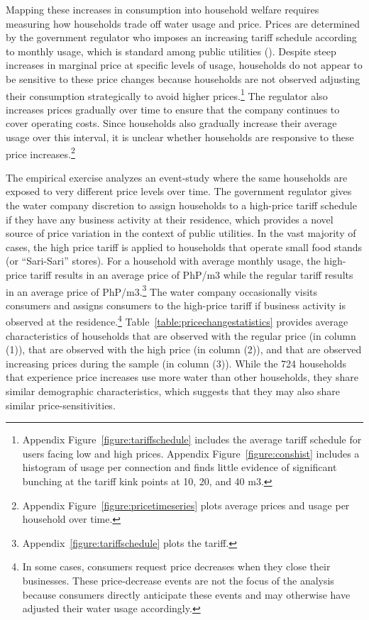 \documentclass[12pt,table]{article}
\begin{document}
Mapping these increases in consumption into household welfare requires measuring how households trade off water usage and price.  Prices are determined by the government regulator who imposes an increasing tariff schedule according to monthly usage, which is standard among public utilities (\cite{hoque2013state}).  Despite steep increases in marginal price at specific levels of usage, households do not appear to be sensitive to these price changes because households are not observed adjusting their consumption strategically to avoid higher prices.\footnote{Appendix Figure~\ref{figure:tariffschedule} includes the average tariff schedule for users facing low and high prices.  Appendix Figure~\ref{figure:conshist} includes a histogram of usage per connection and finds little evidence of significant bunching at the tariff kink points at 10, 20, and 40 m3.}  The regulator also increases prices gradually over time to ensure that the company continues to cover operating costs.  Since households also gradually increase their average usage over this interval, it is unclear whether households are responsive to these price increases.\footnote{Appendix Figure~\ref{figure:pricetimeseries} plots average prices and usage per household over time.}

The empirical exercise analyzes an event-study where the same households are exposed to very different price levels over time.  The government regulator gives the water company discretion to assign households to a high-price tariff schedule if they have any business activity at their residence, which provides a novel source of price variation in the context of public utilities.  In the vast majority of cases, the high price tariff is applied to households that operate small food stands (or ``Sari-Sari'' stores).  For a household with average monthly usage, the high-price tariff results in an average price of PhP/m3 while the regular tariff results in an average price of PhP/m3.\footnote{Appendix~\ref{figure:tariffschedule} plots the tariff.}  The water company occasionally visits consumers and assigns consumers to the high-price tariff if business activity is observed at the residence.\footnote{In some cases, consumers request price decreases when they close their businesses.  These price-decrease events are not the focus of the analysis because consumers directly anticipate these events and may otherwise have adjusted their water usage accordingly.}  Table~\ref{table:pricechangestatistics} provides average characteristics of households that are observed with the regular price (in column (1)), that are observed with the high price (in column (2)), and that are observed increasing prices during the sample (in column (3)).  While the 724 households that experience price increases use more water than other households, they share similar demographic characteristics, which suggests that they may also share similar price-sensitivities.  
\end{document}
